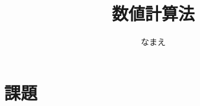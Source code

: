 \documentclass[11pt,a4paper,a4j]{jsarticle}
\title{数値計算法}
\author{なまえ}
\begin{document}
\maketitle

\part*{課題}
\end{document}

